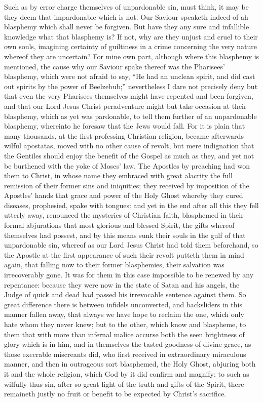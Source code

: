 Such as by error charge themselves of unpardonable sin, must think, it may be they deem that impardonable which is not. Our Saviour speaketh indeed of ah blasphemy which shall never be forgiven. But have they any sure and infallible knowledge what that blasphemy is? If not, why are they unjust and cruel to their own souls, imagining certainty of guiltiness in a crime concerning the very nature whereof they are uncertain? For mine own part, although where this blasphemy is mentioned, the cause why our Saviour spake thereof was the Pharisees’ blasphemy, which were not afraid to say, “He had an unclean spirit, and did cast out spirits by the power of Beelzebub;” nevertheless I dare not precisely deny but that even the very Pharisees themselves might have repented and been forgiven, and that our Lord Jesus Christ peradventure might but take occasion at their blasphemy, which as yet was pardonable, to tell them further of an unpardonable blasphemy, whereinto he foresaw that the Jews would fall. For it is plain that many thousands, at the first professing Christian religion, became afterwards wilful apostatas, moved with no other cause of revolt, but mere indignation that the Gentiles should enjoy the benefit of the Gospel as much as they, and yet not be burthened with the yoke of Moses’ law. The Apostles by preaching had won them to Christ, in whose name they embraced with great alacrity the full remission of their former sins and iniquities; they received by imposition of the Apostles’ hands that grace and power of the Holy Ghost whereby they cured diseases, prophesied, spake with tongues: and yet in the end after all this they fell utterly away, renounced the mysteries of Christian faith, blasphemed in their formal abjurations that most glorious and blessed Spirit, the gifts whereof themselves had possest, and by this means sunk their souls in the gulf of that unpardonable sin, whereof as our Lord Jesus  Christ had told them beforehand, so the Apostle at the first appearance of such their revolt putteth them in mind again, that falling now to their former blasphemies, their salvation was irrecoverably gone. It was for them in this case impossible to be renewed by any repentance: because they were now in the state of Satan and his angels, the Judge of quick and dead had passed his irrevocable sentence against them. So great difference there is between infidels unconverted, and backsliders in this manner fallen away, that always we have hope to reclaim the one, which only hate whom they never knew; but to the other, which know and blaspheme, to them that with more than infernal malice accurse both the seen brightness of glory which is in him, and in themselves the tasted goodness of divine grace, as those execrable miscreants did, who first received in extraordinary miraculous manner, and then in outrageous sort blasphemed, the Holy Ghost, abjuring both it and the whole religion, which God by it did confirm and magnify; to such as wilfully thus sin, after so great light of the truth and gifts of the Spirit, there remaineth justly no fruit or benefit to be expected by Christ’s sacrifice.

